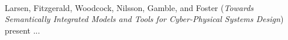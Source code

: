 

\ \hline \ %

Larsen, Fitzgerald, Woodcock, Nilsson, Gamble, and Foster
\cite{isola-2016-larsen}
({\em Towards Semantically Integrated Models and Tools for
Cyber-Physical Systems Design})
present ...